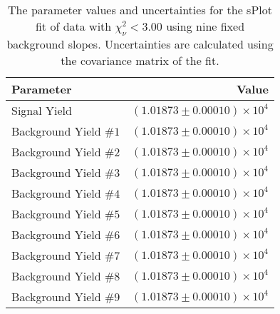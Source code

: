 
\begin{table}[ht]
    \begin{center}
        \begin{tabular}{lr}\toprule
            Parameter & Value \\\midrule
            Signal Yield & $(1.01873 \pm 0.00010) \times 10^{4}$ \\
            Background Yield $\#1$ & $(1.01873 \pm 0.00010) \times 10^{4}$ \\
            Background Yield $\#2$ & $(1.01873 \pm 0.00010) \times 10^{4}$ \\
            Background Yield $\#3$ & $(1.01873 \pm 0.00010) \times 10^{4}$ \\
            Background Yield $\#4$ & $(1.01873 \pm 0.00010) \times 10^{4}$ \\
            Background Yield $\#5$ & $(1.01873 \pm 0.00010) \times 10^{4}$ \\
            Background Yield $\#6$ & $(1.01873 \pm 0.00010) \times 10^{4}$ \\
            Background Yield $\#7$ & $(1.01873 \pm 0.00010) \times 10^{4}$ \\
            Background Yield $\#8$ & $(1.01873 \pm 0.00010) \times 10^{4}$ \\
            Background Yield $\#9$ & $(1.01873 \pm 0.00010) \times 10^{4}$ \\\bottomrule
        \end{tabular}
        \caption{The parameter values and uncertainties for the sPlot fit of data with $\chi^2_\nu < 3.00$ using nine fixed background slopes. Uncertainties are calculated using the covariance matrix of the fit.}\label{tab:splot-fit-results-chisqdof-3.00-fixed-9}
    \end{center}
\end{table}

